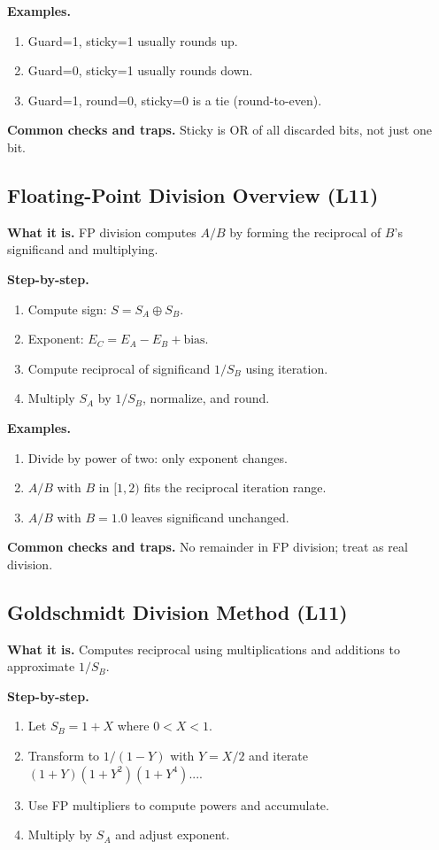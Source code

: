 \documentclass[11pt]{article}
\begin{document}
\textbf{Examples.}
\begin{enumerate}[leftmargin=*]
  \item Guard=1, sticky=1 usually rounds up.
  \item Guard=0, sticky=1 usually rounds down.
  \item Guard=1, round=0, sticky=0 is a tie (round-to-even).
\end{enumerate}

\textbf{Common checks and traps.} Sticky is OR of all discarded bits, not just one bit.

\subsection{Floating-Point Division Overview (L11)}
\textbf{What it is.} FP division computes $A/B$ by forming the reciprocal of $B$'s significand and multiplying.

\textbf{Step-by-step.}
\begin{enumerate}[leftmargin=*]
  \item Compute sign: $S = S_A \oplus S_B$.
  \item Exponent: $E_C = E_A - E_B + \text{bias}$.
  \item Compute reciprocal of significand $1/S_B$ using iteration.
  \item Multiply $S_A$ by $1/S_B$, normalize, and round.
\end{enumerate}

\textbf{Examples.}
\begin{enumerate}[leftmargin=*]
  \item Divide by power of two: only exponent changes.
  \item $A/B$ with $B$ in $[1,2)$ fits the reciprocal iteration range.
  \item $A/B$ with $B=1.0$ leaves significand unchanged.
\end{enumerate}

\textbf{Common checks and traps.} No remainder in FP division; treat as real division.

\subsection{Goldschmidt Division Method (L11)}
\textbf{What it is.} Computes reciprocal using multiplications and additions to approximate $1/S_B$.

\textbf{Step-by-step.}
\begin{enumerate}[leftmargin=*]
  \item Let $S_B = 1 + X$ where $0 < X < 1$.
  \item Transform to $1/(1-Y)$ with $Y = X/2$ and iterate $(1+Y)(1+Y^2)(1+Y^4)...$.
  \item Use FP multipliers to compute powers and accumulate.
  \item Multiply by $S_A$ and adjust exponent.
\end{enumerate}
\end{document}
